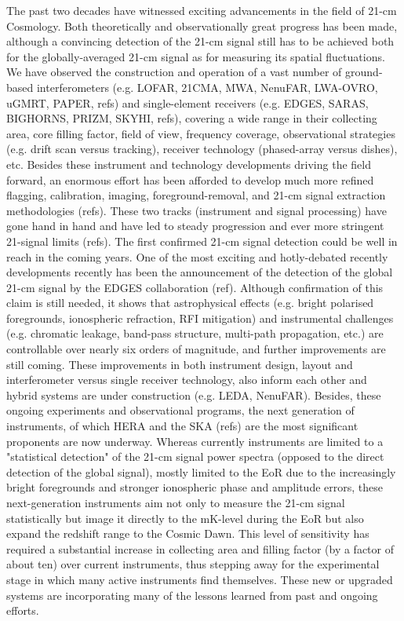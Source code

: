 The past two decades have witnessed exciting advancements in the field of 21-cm Cosmology. Both theoretically and observationally great progress has been made, although a convincing detection of the 21-cm signal still has to be achieved both for the globally-averaged 21-cm signal as for measuring its spatial fluctuations. We have observed the construction and operation of a vast number of ground-based interferometers (e.g. LOFAR, 21CMA, MWA, NenuFAR, LWA-OVRO, uGMRT, PAPER, refs) and single-element receivers (e.g. EDGES, SARAS, BIGHORNS, PRIZM, SKYHI, refs), covering a wide range in their collecting area, core filling factor, field of view, frequency coverage, observational strategies (e.g. drift scan versus tracking), receiver technology (phased-array versus dishes), etc. Besides these instrument and technology developments driving the field forward, an enormous effort has been afforded to develop much more refined flagging, calibration, imaging, foreground-removal, and 21-cm signal extraction methodologies (refs). These two tracks (instrument and signal processing) have gone hand in hand and have led to steady progression and ever more stringent 21-signal limits (refs). The first confirmed 21-cm signal detection could be well in reach in the coming years. 
%
One of the most exciting and hotly-debated recently developments recently has been the announcement of the detection of the global 21-cm signal by the EDGES collaboration (ref). Although confirmation of this claim is still needed, it shows that astrophysical effects (e.g. bright polarised foregrounds, ionospheric refraction, RFI mitigation) and instrumental challenges (e.g. chromatic leakage, band-pass structure, multi-path propagation, etc.) are controllable over nearly six orders of magnitude, and further improvements are still coming. 
%
These improvements in both instrument design, layout and interferometer versus single receiver technology, also inform each other and hybrid systems are under construction (e.g. LEDA, NenuFAR).
%
Besides, these ongoing experiments and observational programs, the next generation of instruments, of which HERA and the SKA (refs) are the most significant proponents are now underway. Whereas currently instruments are limited to a "statistical detection" of the 21-cm signal power spectra (opposed to the direct detection of the global signal), mostly limited to the EoR due to the increasingly bright foregrounds and stronger ionospheric phase and amplitude errors, these next-generation instruments aim not only to measure the 21-cm signal statistically but image it directly to the mK-level during the EoR but also expand the redshift range to the Cosmic Dawn. This level of sensitivity has required a substantial increase in collecting area and filling factor (by a factor of about ten) over current instruments, thus stepping away for the experimental stage in which many active instruments find themselves. These new or upgraded systems are incorporating many of the lessons learned from past and ongoing efforts.   
